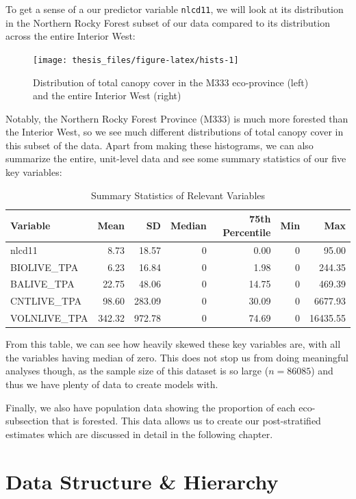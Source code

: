 \documentclass[12pt,twoside]{reedthesis}
\begin{document}
To get a sense of a our predictor variable \texttt{nlcd11}, we will look at its distribution in the Northern Rocky Forest subset of our data compared to its distribution across the entire Interior West:
\begin{figure}

{\centering \texttt{[image: thesis\_files/figure-latex/hists-1]} 

}

\caption[Total canopy cover in the M333 eco-province and Interior West]{Distribution of total canopy cover in the M333 eco-province (left) and the entire Interior West (right)}\label{fig:hists}
\end{figure}
Notably, the Northern Rocky Forest Province (M333) is much more forested than the Interior West, so we see much different distributions of total canopy cover in this subset of the data. Apart from making these histograms, we can also summarize the entire, unit-level data and see some summary statistics of our five key variables:
\clearpage
\begin{longtable}[t]{lrrrrrr}
\caption[Summary Statistics of Relevant Variables]{\label{tab:var-tab}Summary Statistics of Relevant Variables}\\
\toprule
Variable & Mean & SD & Median & 75th Percentile & Min & Max\\
\midrule
nlcd11 & 8.73 & 18.57 & 0 & 0.00 & 0 & 95.00\\
BIOLIVE\_TPA & 6.23 & 16.84 & 0 & 1.98 & 0 & 244.35\\
BALIVE\_TPA & 22.75 & 48.06 & 0 & 14.75 & 0 & 469.39\\
CNTLIVE\_TPA & 98.60 & 283.09 & 0 & 30.09 & 0 & 6677.93\\
VOLNLIVE\_TPA & 342.32 & 972.78 & 0 & 74.69 & 0 & 16435.55\\
\bottomrule
\end{longtable}
From this table, we can see how heavily skewed these key variables are, with all the variables having median of zero. This does not stop us from doing meaningful analyses though, as the sample size of this dataset is so large (\(n = 86085\)) and thus we have plenty of data to create models with.

Finally, we also have population data showing the proportion of each eco-subsection that is forested. This data allows us to create our post-stratified estimates which are discussed in detail in the following chapter.

\hypertarget{data-structure-hierarchy}{%
\section{Data Structure \& Hierarchy}\label{data-structure-hierarchy}}
\end{document}
